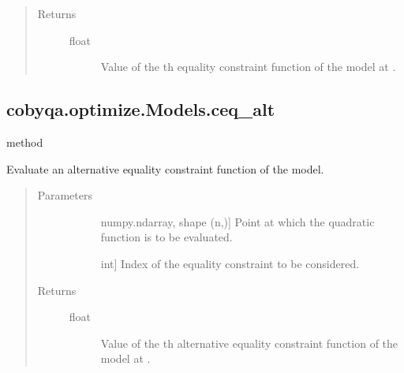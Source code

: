 \documentclass[letterpaper,10pt,english]{sphinxmanual}
\begin{document}
\begin{fulllineitems}
\begin{fulllineitems}
\begin{quote}
\begin{description}
\item[{Returns}] \leavevmode\begin{description}
\item[{float}] \leavevmode
\sphinxAtStartPar
Value of the \sphinxhyphen{}th equality constraint function of the model at
.

\end{description}

\end{description}\end{quote}

\end{fulllineitems}



\subsection{cobyqa.optimize.Models.ceq\_alt}
\label{\detokenize{refs/generated/cobyqa.optimize.Models.ceq_alt:cobyqa-optimize-models-ceq-alt}}\label{\detokenize{refs/generated/cobyqa.optimize.Models.ceq_alt::doc}}
\sphinxAtStartPar
method

\begin{fulllineitems}
\label{\detokenize{refs/generated/cobyqa.optimize.Models.ceq_alt:cobyqa.optimize.Models.ceq_alt}}
\sphinxAtStartPar
Evaluate an alternative equality constraint function of the model.
\begin{quote}\begin{description}
\item[{Parameters}] \leavevmode\begin{description}
\item[{}] \leavevmode{[}numpy.ndarray, shape (n,){]}
\sphinxAtStartPar
Point at which the quadratic function is to be evaluated.

\item[{}] \leavevmode{[}int{]}
\sphinxAtStartPar
Index of the equality constraint to be considered.

\end{description}

\item[{Returns}] \leavevmode\begin{description}
\item[{float}] \leavevmode
\sphinxAtStartPar
Value of the \sphinxhyphen{}th alternative equality constraint function of the
model at .


\end{description}
\end{description}
\end{quote}
\end{fulllineitems}
\end{fulllineitems}
\end{document}
